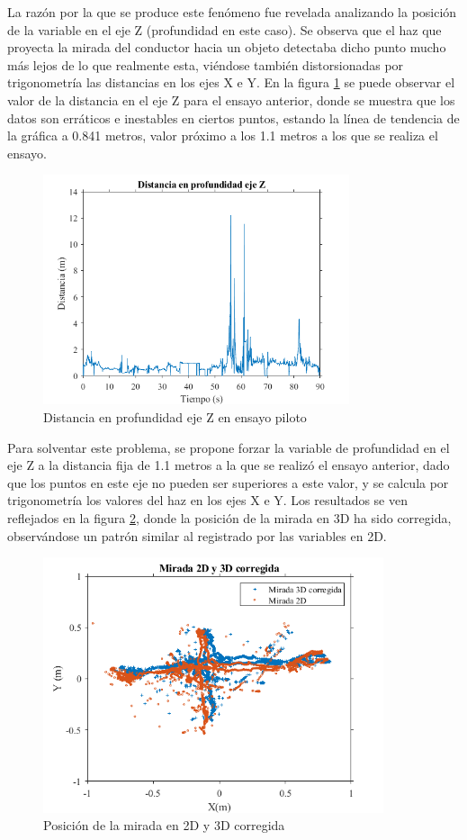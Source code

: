 La razón por la que se produce este fenómeno fue revelada analizando la posición de la variable en el eje Z (profundidad en este caso). Se observa que el haz que proyecta la mirada del conductor hacia un objeto detectaba dicho punto mucho más lejos de lo que realmente esta, viéndose también distorsionadas por trigonometría las distancias en los ejes X e Y.
En la figura \ref{fig:4.12} se puede observar el valor de la distancia en el eje Z para el ensayo anterior, donde se muestra que los datos son erráticos e inestables en ciertos puntos, estando la línea de tendencia de la gráfica a 0.841 metros, valor próximo a los 1.1 metros a los que se realiza el ensayo.

\vspace{-15pt}
\begin{figure}[h]
    \centering
    \includegraphics[width=9cm]
    {figures/4.12.png}
    \caption{ \label{fig:4.12} Distancia en profundidad eje Z en ensayo piloto}
\end{figure}

Para solventar este problema, se propone forzar la variable de profundidad en el eje Z a la distancia fija de 1.1 metros a la que se realizó el ensayo anterior, dado que los puntos en este eje no pueden ser superiores a este valor, y se calcula por trigonometría los valores del haz en los ejes X e Y. Los resultados se ven reflejados en la figura \ref{fig:4.13}, donde la posición de la mirada en 3D ha sido corregida, observándose un patrón similar al registrado por las variables en 2D.

\vspace{-15pt}
\begin{figure}[h]
    \centering
    \includegraphics[width=10cm]
    {figures/4.13.png}
    \caption{ \label{fig:4.13} Posición de la mirada en 2D y 3D corregida}
\end{figure}

